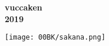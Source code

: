 \documentclass[10pt,b5paper,papersize,dvipdfmx]{jsbook}
\begin{document}
\clearpage\thispagestyle{empty}\mbox{}\newpage %
\ifodd\thepage %
  \thispagestyle{empty}\mbox{}\newpage
\fi

\thispagestyle{empty}
\quad

\vspace{70truemm}

\begin{center}
  \ttfamily\bfseries \fontsize{15}{0}\selectfont
  vuccaken
  \\ \vspace{1zw}
  2019
\end{center}

\vspace{5truemm}

\begin{center}
  \texttt{[image: 00BK/sakana.png]}
\end{center}
\end{document}
